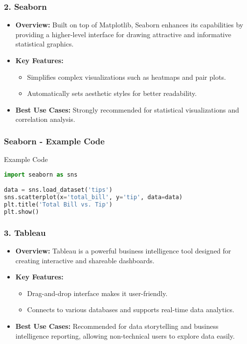 \documentclass{beamer}
\begin{document}
\begin{frame}
    \frametitle{2. Seaborn}
    \begin{itemize}
        \item \textbf{Overview:} 
        Built on top of Matplotlib, Seaborn enhances its capabilities by providing a higher-level interface for drawing attractive and informative statistical graphics.
        
        \item \textbf{Key Features:}
        \begin{itemize}
            \item Simplifies complex visualizations such as heatmaps and pair plots.
            \item Automatically sets aesthetic styles for better readability.
        \end{itemize}
        
        \item \textbf{Best Use Cases:}
        Strongly recommended for statistical visualizations and correlation analysis.
    \end{itemize}
\end{frame}

\begin{frame}[fragile]
    \frametitle{Seaborn - Example Code}
    \begin{block}{Example Code}
    \begin{lstlisting}[language=Python]
import seaborn as sns

data = sns.load_dataset('tips')
sns.scatterplot(x='total_bill', y='tip', data=data)
plt.title('Total Bill vs. Tip')
plt.show()
    \end{lstlisting}
    \end{block}
\end{frame}

\begin{frame}
    \frametitle{3. Tableau}
    \begin{itemize}
        \item \textbf{Overview:} 
        Tableau is a powerful business intelligence tool designed for creating interactive and shareable dashboards.
        
        \item \textbf{Key Features:}
        \begin{itemize}
            \item Drag-and-drop interface makes it user-friendly.
            \item Connects to various databases and supports real-time data analytics.
        \end{itemize}
        
        \item \textbf{Best Use Cases:}
        Recommended for data storytelling and business intelligence reporting, allowing non-technical users to explore data easily.
    \end{itemize}
\end{frame}
\end{document}

